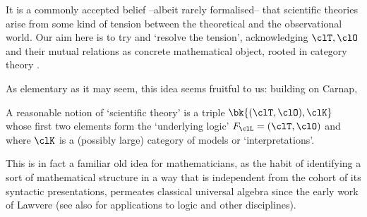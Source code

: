 It is a commonly accepted belief --albeit rarely formalised-- that scientific theories arise from some kind of tension between the theoretical and the observational world. Our aim here is to try and `resolve the tension', acknowledging $\clT,\clO$ and their mutual relations as concrete mathematical object, rooted in category theory \cite{refs,on,ct}.

As elementary as it may seem, this idea seems fruitful to us: building on Carnap, 
\begin{remark*}
	A reasonable notion of `scientific theory' is a triple $\bk{(\clT,\clO), \clK}$ whose first two elements form the `underlying logic' $F_\clL=(\clT,\clO)$ and where $\clK$ is a (possibly large) category of models or `interpretations'. 
\end{remark*}
This is in fact a familiar old idea for mathematicians, as the habit of identifying a sort of mathematical structure in a way that is independent from the cohort of its syntactic presentations, permeates classical universal algebra since the early work of Lawvere \cite{lawvere1963functorial,lawvere1996unity} (see also \cite{abramskyno,Borceux1994,makkai1989accessible} for applications to logic and other disciplines).

